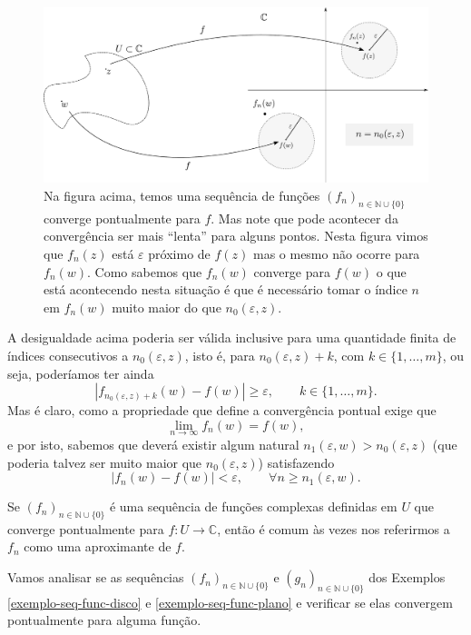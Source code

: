 \begin{figure}[H]
\centering
\includegraphics[width=0.95\linewidth]{Figuras/convergencia-pontual-redimensionado}
\caption{Na figura acima, temos uma sequência de funções 
$(f_n)_{n\in\mathbb{N}\cup\{0\}}$ converge pontualmente para $f$. 
Mas note que pode acontecer da convergência ser mais ``lenta'' para alguns pontos. Nesta
figura vimos que $f_n(z)$ está $\varepsilon$ próximo de $f(z)$ mas o mesmo não ocorre
para $f_n(w)$. Como sabemos que $f_n(w)$ converge para $f(w)$ o que está acontecendo
nesta situação é que é necessário tomar o índice $n$ em $f_n(w)$ muito maior do 
que $n_0(\varepsilon,z)$.}
\label{fig:convergencia-pontual-redimensionado}
\end{figure}


A desigualdade acima poderia ser válida inclusive para uma quantidade finita 
de índices consecutivos a $n_0(\varepsilon,z)$, isto é, para 
$n_0(\varepsilon,z)+k$, com $k\in\{1,\ldots,m\}$, ou seja, poderíamos ter ainda
\[
|f_{n_0(\varepsilon,z)+k}(w)-f(w)| \geqslant \varepsilon,
\qquad k\in\{1,\ldots,m\}. 
\] 
Mas é claro, como a propriedade que define a convergência pontual exige que
\[
\lim_{n\to\infty} f_n(w) = f(w),
\]
e por isto, sabemos que deverá existir algum natural $n_1(\varepsilon,w)>n_0(\varepsilon,z)$ (que poderia talvez ser muito maior que $n_0(\varepsilon,z)$) 
satisfazendo
\[
|f_{n}(w)-f(w)| < \varepsilon, \qquad \forall n\geqslant n_1(\varepsilon,w).
\]

Se $(f_n)_{n\in\mathbb{N}\cup\{0\}}$ é uma sequência de funções complexas definidas em
$U$ que converge pontualmente para $f:U\to\mathbb{C}$, então é comum às vezes 
nos referirmos a $f_n$ como uma aproximante de $f$.


\bigskip 
Vamos analisar se as sequências $(f_n)_{n\in\mathbb{N}\cup\{0\}}$ 
e $(g_n)_{n\in\mathbb{N}\cup\{0\}}$ dos Exemplos \ref{exemplo-seq-func-disco}
e \ref{exemplo-seq-func-plano} e verificar se elas convergem pontualmente para alguma função.


